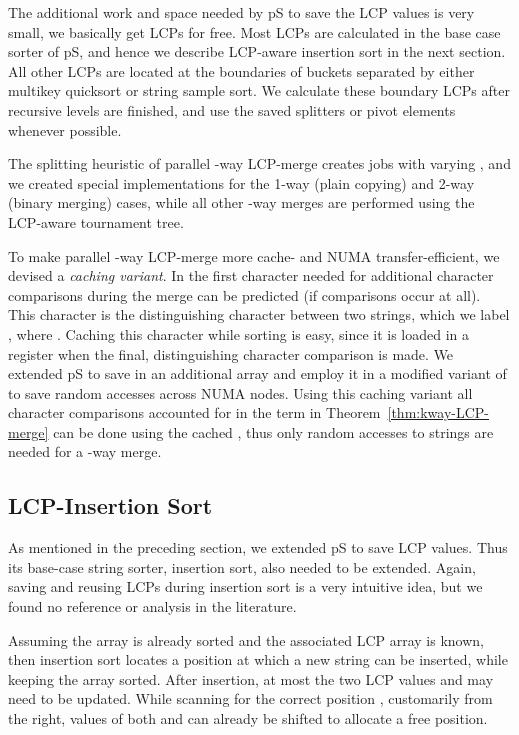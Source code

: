 \documentclass[a4paper]{myjournal}
\begin{document}
The additional work and space needed by pS to save the LCP values is very
small, we basically get LCPs for free. Most LCPs are calculated in the base case
sorter of pS, and hence we describe LCP-aware insertion sort in the next
section. All other LCPs are located at the boundaries of buckets separated by
either multikey quicksort or string sample sort. We calculate these boundary
LCPs after recursive levels are finished, and use the saved splitters or pivot
elements whenever possible.

The splitting heuristic of parallel -way LCP-merge creates jobs with varying
, and we created special implementations for the 1-way (plain copying) and
2-way (binary merging) cases, while all other -way merges are performed using
the LCP-aware tournament tree.

To make parallel -way LCP-merge more cache- and NUMA transfer-efficient, we
devised a \emph{caching variant}. In \LCPCompare the first character needed for
additional character comparisons during the merge can be predicted (if
comparisons occur at all).  This character is the distinguishing character
between two strings, which we label , where . Caching this character while sorting is easy, since it is
loaded in a register when the final, distinguishing character comparison is
made. We extended pS to save  in an additional array and employ
it in a modified variant of \LCPCompare to save random accesses across NUMA
nodes.  Using this caching variant all character comparisons accounted for in
the  term in Theorem~\ref{thm:kway-LCP-merge} can be done using
the cached , thus only  random accesses to strings are
needed for a -way merge.

\subsection{LCP-Insertion Sort}\label{sec:lcp-inssort}

As mentioned in the preceding section, we extended pS to save LCP
values. Thus its base-case string sorter, insertion sort, also needed to be
extended. Again, saving and reusing LCPs during insertion sort is a very
intuitive idea, but we found no reference or analysis in the literature.

Assuming the array  is already sorted and
the associated LCP array  is known, then insertion sort locates a position
 at which a new string  can be inserted, while keeping the array
sorted. After insertion, at most the two LCP values  and  may need
to be updated. While scanning for the correct position , customarily from the
right, values of both  and  can already be shifted to allocate a
free position.
\end{document}
